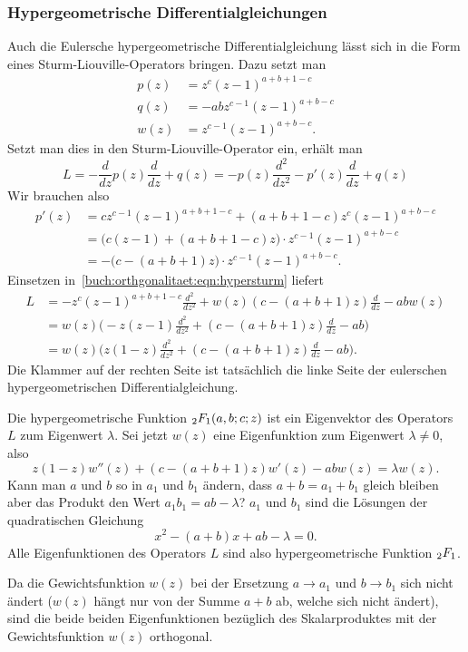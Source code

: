 \subsubsection{Hypergeometrische Differentialgleichungen}
Auch die Eulersche hypergeometrische Differentialgleichung
lässt sich in die Form eines Sturm-Liouville-Operators
%
bringen.
Dazu setzt man
\begin{align*}
p(z)
&=
z^c(z-1)^{a+b+1-c}
\\
q(z)
&=
-abz^{c-1}(z-1)^{a+b-c}
\\
w(z)
&=
z^{c-1}(z-1)^{a+b-c}.
\end{align*}
Setzt man dies in den Sturm-Liouville-Operator ein, erhält man
\begin{equation}
L
=
-\frac{d}{dz}p(z)\frac{d}{dz} + q(z)
=
-p(z)\frac{d^2}{dz^2}
-p'(z)\frac{d}{dz}
+q(z)
\label{buch:orthgonalitaet:eqn:hypersturm}
\end{equation}
Wir brauchen also
\begin{align*}
p'(z)
&=
cz^{c-1}(z-1)^{a+b+1-c}
+
(a+b+1-c)
z^c
(z-1)^{a+b-c}
\\
&=
\bigl(
c(z-1)+
(a+b+1-c)z
\bigr)
\cdot
z^{c-1}(z-1)^{a+b-c}
\\
&=
-
\bigl(
c-(a+b+1)z
\bigr)
\cdot
z^{c-1}(z-1)^{a+b-c}.
\end{align*}
Einsetzen in~\eqref{buch:orthgonalitaet:eqn:hypersturm} liefert
\begin{align*}
L
&=
-z^c(z-1)^{a+b+1-c} \frac{d^2}{dz^2}
+
w(z)
(c-(a+b+1)z)
\frac{d}{dz}
-
abw(z)
\\
&=
w(z)
\biggl(
-
z(z-1)
\frac{d^2}{dz^2}
+
(c-(a+b+1)z)
\frac{d}{dz}
-ab
\biggr)
\\
&=
w(z)
\biggl(
z(1-z)
\frac{d^2}{dz^2}
+
(c-(a+b+1)z)
\frac{d}{dz}
-ab
\biggr).
\end{align*}
Die Klammer auf der rechten Seite ist tatsächlich die linke Seite der
eulerschen hypergeometrischen Differentialgleichung.

Die hypergeometrische Funktion $\mathstrut_2F_1(a,b;c;z)$ ist ein
Eigenvektor des Operators $L$ zum Eigenwert $\lambda$.
Sei jetzt $w(z)$ eine Eigenfunktion zum Eigenwert $\lambda\ne 0$,
also
\[
z(1-z)w''(z) + (c-(a+b+1)z)w'(z) - ab w(z) = \lambda w(z).
\]
Kann man $a$ und $b$ so in $a_1$ und $b_1$ ändern, dass $a+b=a_1+b_1$
gleich bleiben aber das Produkt den Wert $a_1b_1=ab-\lambda$?
$a_1$ und $b_1$ sind die Lösungen der quadratischen Gleichung
\[
x^2 - (a+b)x + ab-\lambda = 0.
\]
Alle Eigenfunktionen des Operators $L$ sind also hypergeometrische
Funktion $\mathstrut_2F_1$.

Da die Gewichtsfunktion $w(z)$ bei der Ersetzung $a\to a_1$ und $b\to b_1$
sich nicht ändert ($w(z)$ hängt nur von der Summe $a+b$ ab, welche sich
nicht ändert), sind die beide beiden Eigenfunktionen bezüglich
des Skalarproduktes mit der Gewichtsfunktion $w(z)$ orthogonal.






